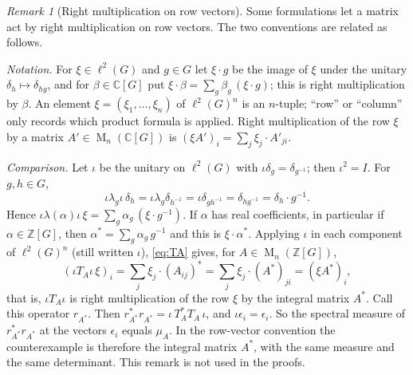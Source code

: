 \documentclass[11pt]{article}
\theoremstyle{remark}
\newtheorem{remark}[theorem]{Remark}
\numberwithin{equation}{section}
\newcommand{\Z}{\mathbb Z}
\newcommand{\C}{\mathbb C}
\newcommand{\Mat}{\operatorname{M}}
\begin{document}
\begin{remark}[Right multiplication on row vectors]\label{rem:convention}
Some formulations let a matrix act by right multiplication on row vectors. The two conventions are related as follows.

\emph{Notation.} For $\xi\in\ell^2(G)$ and $g\in G$ let $\xi\cdot g$ be the image of $\xi$ under the unitary $\delta_h\mapsto\delta_{hg}$, and for $\beta\in\C[G]$ put $\xi\cdot\beta=\sum_g\beta_g\,(\xi\cdot g)$; this is right multiplication by $\beta$. An element $\xi=(\xi_1,\dots,\xi_n)$ of $\ell^2(G)^n$ is an $n$-tuple; ``row'' or ``column'' only records which product formula is applied. Right multiplication of the row $\xi$ by a matrix $A'\in\Mat_n(\C[G])$ is $(\xi A')_i=\sum_j\xi_j\cdot A'_{ji}$.

\emph{Comparison.} Let $\iota$ be the unitary on $\ell^2(G)$ with $\iota\delta_g=\delta_{g^{-1}}$; then $\iota^2=I$. For $g,h\in G$,
\[
 \iota\lambda_g\iota\,\delta_h=\iota\lambda_g\delta_{h^{-1}}=\iota\delta_{gh^{-1}}=\delta_{hg^{-1}}=\delta_h\cdot g^{-1}.
\]
Hence $\iota\lambda(\alpha)\iota\,\xi=\sum_g\alpha_g\,(\xi\cdot g^{-1})$. If $\alpha$ has real coefficients, in particular if $\alpha\in\Z[G]$, then $\alpha^*=\sum_g\alpha_g\,g^{-1}$ and this is $\xi\cdot\alpha^*$. Applying $\iota$ in each component of $\ell^2(G)^n$ (still written $\iota$), \eqref{eq:TA} gives, for $A\in\Mat_n(\Z[G])$,
\[
 (\iota T_A\iota\,\xi)_i=\sum_j\xi_j\cdot(A_{ij})^*=\sum_j\xi_j\cdot(A^*)_{ji}=(\xi A^*)_i ,
\]
that is, $\iota T_A\iota$ is right multiplication of the row $\xi$ by the integral matrix $A^*$. Call this operator $r_{A^*}$. Then $r_{A^*}^*r_{A^*}=\iota\,T_A^*T_A\,\iota$, and $\iota\epsilon_i=\epsilon_i$. So the spectral measure of $r_{A^*}^*r_{A^*}$ at the vectors $\epsilon_i$ equals $\mu_A$. In the row-vector convention the counterexample is therefore the integral matrix $A^*$, with the same measure and the same determinant. This remark is not used in the proofs.
\end{remark}
\end{document}
